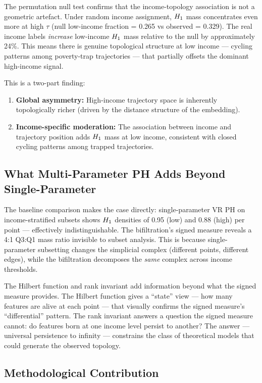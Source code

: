 The permutation null test confirms that the income-topology association is
not a geometric artefact. Under random income assignment, $H_{1}$ mass
concentrates even more at high $\tau$ (null low-income fraction = 0.265 vs
observed = 0.329). The real income labels \emph{increase} low-income
$H_{1}$ mass relative to the null by approximately 24\%. This means there
is genuine topological structure at low income --- cycling patterns among
poverty-trap trajectories --- that partially offsets the dominant high-income
signal.

This is a two-part finding:
\begin{enumerate}
  \item \textbf{Global asymmetry:} High-income trajectory space is
    inherently topologically richer (driven by the distance structure of the
    embedding).
  \item \textbf{Income-specific moderation:} The association between income
    and trajectory position adds $H_{1}$ mass at low income, consistent
    with closed cycling patterns among trapped trajectories.
\end{enumerate}

\subsection{What Multi-Parameter PH Adds Beyond Single-Parameter}

The baseline comparison makes the case directly: single-parameter VR PH on
income-stratified subsets shows $H_{1}$ densities of 0.95 (low) and 0.88
(high) per point --- effectively indistinguishable. The bifiltration's signed
measure reveals a 4:1 Q3:Q1 mass ratio invisible to subset analysis. This is
because single-parameter subsetting changes the simplicial complex (different
points, different edges), while the bifiltration decomposes the \emph{same}
complex across income thresholds.

The Hilbert function and rank invariant add information beyond what the
signed measure provides. The Hilbert function gives a ``state'' view --- how
many features are alive at each point --- that visually confirms the signed
measure's ``differential'' pattern. The rank invariant answers a question the
signed measure cannot: do features born at one income level persist to
another? The answer --- universal persistence to infinity --- constrains the
class of theoretical models that could generate the observed topology.

\subsection{Methodological Contribution}

